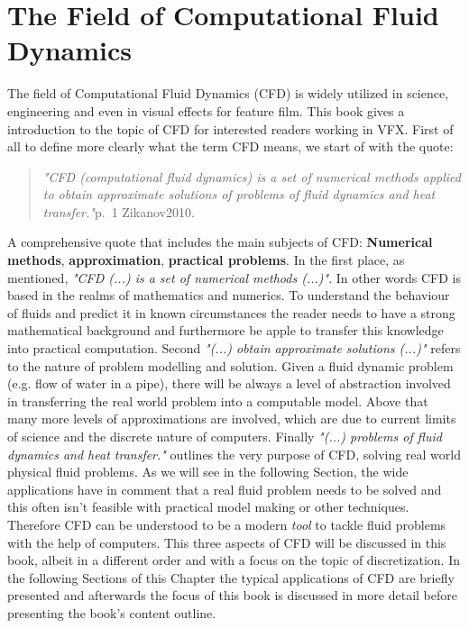 %
%
%




\chapter{The Field of Computational Fluid Dynamics}

The field of Computational Fluid Dynamics (CFD) is widely utilized in science, engineering and even in visual effects for feature film. This book gives a introduction to the topic of CFD for interested readers working in VFX. First of all to define more clearly what the term CFD means, we start of with the quote:

\begin{quote}
\emph{"CFD (computational fluid dynamics) is a set of numerical methods applied to obtain
approximate solutions of problems of fluid dynamics and heat transfer."}p.~1 Zikanov2010. 
\end{quote}

A comprehensive quote that includes the main subjects of CFD: \textbf{Numerical methods}, \textbf{approximation}, \textbf{practical problems}.  In the first place, as mentioned, \emph{"CFD (...) is a set of numerical methods (...)"}. In other words CFD is based in the realms of mathematics and numerics. To understand the behaviour of fluids and predict it in known circumstances the reader needs to have a strong mathematical background and furthermore be apple to transfer this knowledge into practical computation. Second \emph{"(...) obtain approximate solutions (...)"} refers to the nature of problem modelling and solution. Given a fluid dynamic problem (e.g. flow of water in a pipe), there will be always a level of abstraction involved in transferring the real world problem into a computable model. Above that many more levels of approximations are involved, which are due to current limits of science and the discrete nature of computers. Finally \emph{"(...) problems of fluid dynamics and heat transfer."} outlines the very purpose of CFD, solving real world physical fluid problems. As we will see in the following Section, the wide applications have in comment that a real fluid problem needs to be solved and this often isn't feasible with practical model making or other techniques. Therefore CFD can be understood to be a modern \emph{tool} to tackle fluid problems with the help of computers. This three aspects of CFD will be discussed in this book, albeit in a different order and with a focus on the topic of discretization. In the following Sections of this Chapter the typical applications of CFD are briefly presented and afterwards the focus of this book is discussed in more detail before presenting the book's content outline. 

